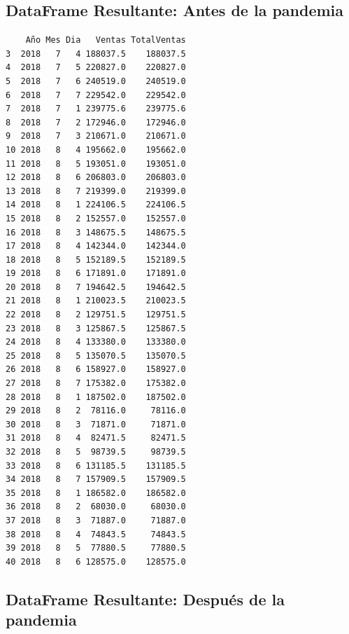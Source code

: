 \documentclass[
  us-letterpaper,
]{scrreprt}
\theoremstyle{plain}
\theoremstyle{plain}
\theoremstyle{definition}
\theoremstyle{remark}
\begin{document}
\subsection{DataFrame Resultante: Antes de la
pandemia}\label{dataframe-resultante-antes-de-la-pandemia}

\begin{verbatim}
    Año Mes Dia   Ventas TotalVentas
3  2018   7   4 188037.5    188037.5
4  2018   7   5 220827.0    220827.0
5  2018   7   6 240519.0    240519.0
6  2018   7   7 229542.0    229542.0
7  2018   7   1 239775.6    239775.6
8  2018   7   2 172946.0    172946.0
9  2018   7   3 210671.0    210671.0
10 2018   8   4 195662.0    195662.0
11 2018   8   5 193051.0    193051.0
12 2018   8   6 206803.0    206803.0
13 2018   8   7 219399.0    219399.0
14 2018   8   1 224106.5    224106.5
15 2018   8   2 152557.0    152557.0
16 2018   8   3 148675.5    148675.5
17 2018   8   4 142344.0    142344.0
18 2018   8   5 152189.5    152189.5
19 2018   8   6 171891.0    171891.0
20 2018   8   7 194642.5    194642.5
21 2018   8   1 210023.5    210023.5
22 2018   8   2 129751.5    129751.5
23 2018   8   3 125867.5    125867.5
24 2018   8   4 133380.0    133380.0
25 2018   8   5 135070.5    135070.5
26 2018   8   6 158927.0    158927.0
27 2018   8   7 175382.0    175382.0
28 2018   8   1 187502.0    187502.0
29 2018   8   2  78116.0     78116.0
30 2018   8   3  71871.0     71871.0
31 2018   8   4  82471.5     82471.5
32 2018   8   5  98739.5     98739.5
33 2018   8   6 131185.5    131185.5
34 2018   8   7 157909.5    157909.5
35 2018   8   1 186582.0    186582.0
36 2018   8   2  68030.0     68030.0
37 2018   8   3  71887.0     71887.0
38 2018   8   4  74843.5     74843.5
39 2018   8   5  77880.5     77880.5
40 2018   8   6 128575.0    128575.0
\end{verbatim}

\subsection{DataFrame Resultante: Después de la
pandemia}\label{dataframe-resultante-despuuxe9s-de-la-pandemia}
\end{document}

